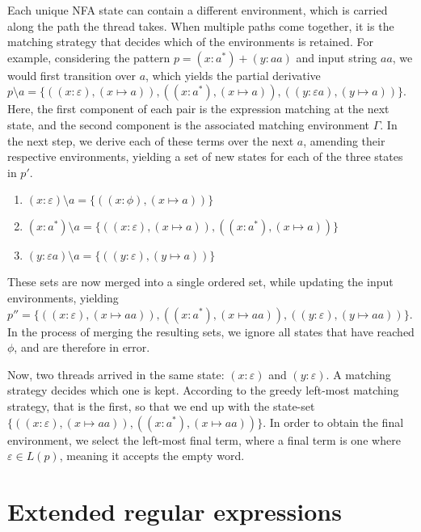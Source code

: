Each unique NFA state can contain a different environment, which is carried
along the path the thread takes. When multiple paths come together, it is the
matching strategy that decides which of the environments is retained. For
example, considering the pattern $p = (x:a^*) + (y:aa)$ and input string $aa$,
we would first transition over $a$, which yields the partial derivative $p
\setminus a = \{ ((x:\varepsilon), (x \mapsto a)), ((x:a^*), (x \mapsto a)),
((y:\varepsilon a), (y \mapsto a)) \}$. Here, the first component of each pair
is the expression matching at the next state, and the second component is the
associated matching environment $\Gamma$. In the next step, we derive each of
these terms over the next $a$, amending their respective environments, yielding
a set of new states for each of the three states in $p'$.

\begin{enumerate}
   \item
      $(x:\varepsilon) \setminus a = \{ ((x:\phi), (x \mapsto a)) \}$
   \item
      $(x:a^*) \setminus a = \{
         ((x:\varepsilon), (x \mapsto a)),
         ((x:a^*), (x \mapsto a))
      \}$
   \item
      $(y:\varepsilon a) \setminus a = \{ ((y:\varepsilon), (y \mapsto a)) \}$
\end{enumerate}

These sets are now merged into a single ordered set, while updating the input
environments, yielding $p'' = \{ ((x:\varepsilon), (x \mapsto aa)), ((x:a^*), (x
\mapsto aa)), ((y:\varepsilon), (y \mapsto aa)) \}$. In the process of merging
the resulting sets, we ignore all states that have reached $\phi$, and are
therefore in error.

Now, two threads arrived in the same state: $(x:\varepsilon)$ and
$(y:\varepsilon)$. A matching strategy decides which one is kept. According to
the greedy left-most matching strategy, that is the first, so that we end up
with the state-set $\{ ((x:\varepsilon), (x \mapsto aa)), ((x:a^*), (x \mapsto
aa)) \}$. In order to obtain the final environment, we select the left-most
final term, where a final term is one where $\varepsilon \in L(p)$, meaning it
accepts the empty word.


\section{Extended regular expressions}

